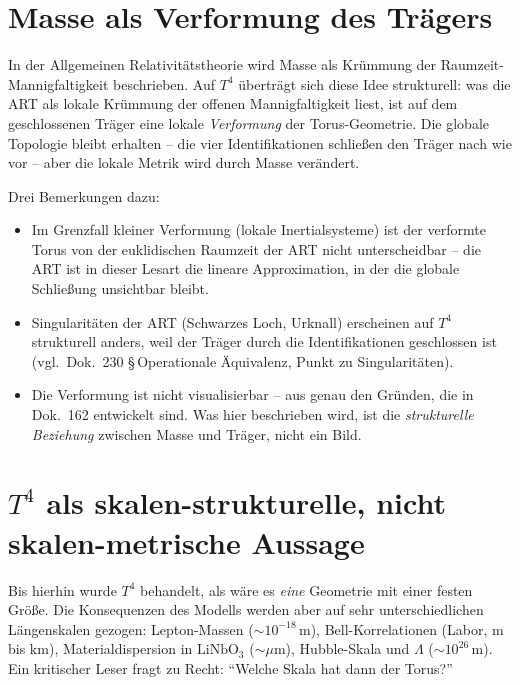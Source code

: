 \section{Masse als Verformung des Trägers}

In der Allgemeinen Relativitätstheorie wird Masse als Krümmung der
Raumzeit-Mannigfaltigkeit beschrieben. Auf $T^4$ überträgt sich diese
Idee strukturell: was die ART als lokale Krümmung der offenen Mannigfaltigkeit
liest, ist auf dem geschlossenen Träger eine lokale \emph{Verformung}
der Torus-Geometrie. Die globale Topologie bleibt erhalten -- die vier
Identifikationen schließen den Träger nach wie vor -- aber die lokale
Metrik wird durch Masse verändert.

Drei Bemerkungen dazu:

\begin{itemize}[leftmargin=2em,itemsep=4pt,topsep=4pt]
  \item Im Grenzfall kleiner Verformung (lokale Inertialsysteme) ist
        der verformte Torus von der euklidischen Raumzeit der ART
        nicht unterscheidbar -- die ART ist in dieser Lesart die
        lineare Approximation, in der die globale Schließung
        unsichtbar bleibt.
  \item Singularitäten der ART (Schwarzes Loch, Urknall) erscheinen
        auf $T^4$ strukturell anders, weil der Träger durch die
        Identifikationen geschlossen ist (vgl.\ Dok.~230 §\,Operationale
        Äquivalenz, Punkt zu Singularitäten).
  \item Die Verformung ist nicht visualisierbar -- aus genau den
        Gründen, die in Dok.~162 entwickelt sind. Was hier beschrieben
        wird, ist die \emph{strukturelle Beziehung} zwischen Masse und
        Träger, nicht ein Bild.
\end{itemize}

\section{$T^4$ als skalen-strukturelle, nicht skalen-metrische Aussage}

Bis hierhin wurde $T^4$ behandelt, als wäre es \emph{eine} Geometrie
mit einer festen Größe. Die Konsequenzen des Modells werden aber auf
sehr unterschiedlichen Längenskalen gezogen: Lepton-Massen
($\sim 10^{-18}\,\mathrm{m}$), Bell-Korrelationen (Labor,
$\mathrm{m}$ bis $\mathrm{km}$), Materialdispersion in
$\mathrm{LiNbO}_3$ ($\sim \mu\mathrm{m}$), Hubble-Skala und $\Lambda$
($\sim 10^{26}\,\mathrm{m}$). Ein kritischer Leser fragt zu Recht:
\enquote{Welche Skala hat dann der Torus?}

